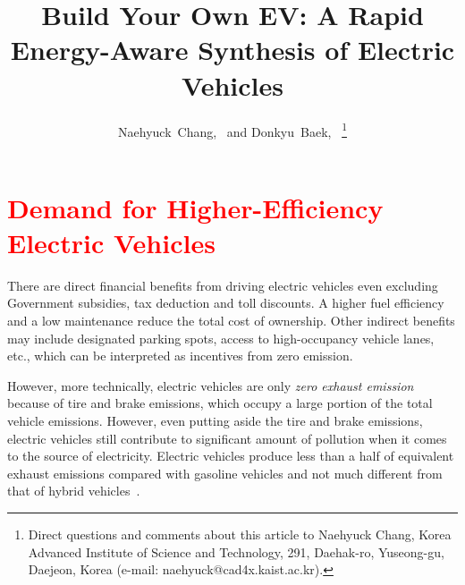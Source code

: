 \documentclass[journal]{IEEEtran}
\begin{document}
\title{Build Your Own EV: A Rapid Energy-Aware Synthesis of Electric Vehicles}

\author{
	Naehyuck~Chang,~ and
	Donkyu~Baek,~
\thanks{Direct questions and comments about this article to Naehyuck Chang, Korea Advanced Institute of Science and Technology, 291, Daehak-ro, Yuseong-gu, Daejeon, Korea (e-mail: naehyuck@cad4x.kaist.ac.kr).}
}

\maketitle



\section{\textcolor{red}{Demand for Higher-Efficiency Electric Vehicles}} \label{sec:motivation}

There are direct financial benefits from driving electric vehicles even excluding Government subsidies, tax deduction and toll discounts. A higher fuel efficiency and a low maintenance reduce the total cost of ownership. %
Other indirect benefits may include designated parking spots, access to high-occupancy vehicle lanes, etc., which can be interpreted as incentives from zero emission. %

However, more technically, electric vehicles are only \textit{zero exhaust emission}  because of tire and brake emissions, which occupy a large portion of the total vehicle emissions. However, even putting aside the tire and brake emissions, electric vehicles still contribute to significant amount of pollution when it comes to the source of electricity. Electric vehicles produce less than a half of equivalent exhaust emissions compared with gasoline vehicles and not much different from that of hybrid vehicles~\cite{AFDC}.
\end{document}
